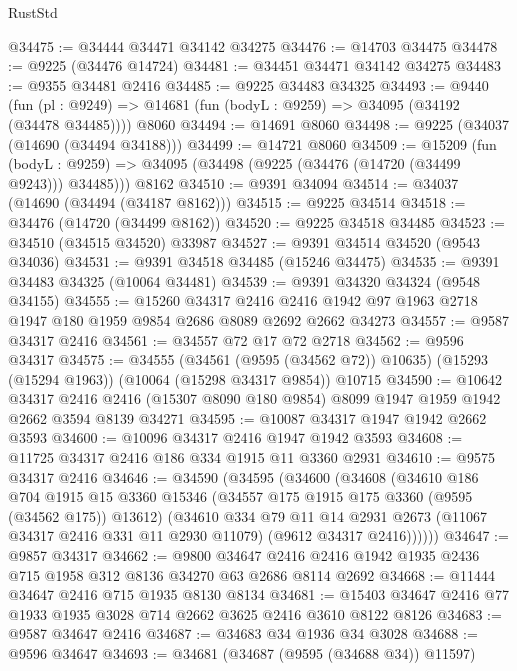 \begin{lexlean}{RustStd}
\begin{coremodule}
@34475 := @34444 @34471 @34142 @34275
@34476 := @14703 @34475
@34478 := @9225 (@34476 @14724)
@34481 := @34451 @34471 @34142 @34275
@34483 := @9355 @34481 @2416
@34485 := @9225 @34483 @34325
@34493 := @9440
    (fun (pl : @9249) => @14681 (fun (bodyL : @9259) => @34095 (@34192 (@34478 @34485))))
    @8060
@34494 := @14691 @8060
@34498 := @9225 (@34037 (@14690 (@34494 @34188)))
@34499 := @14721 @8060
@34509 := @15209
    (fun (bodyL : @9259) => @34095 (@34498 (@9225 (@34476 (@14720 (@34499 @9243))) @34485)))
    @8162
@34510 := @9391 @34094
@34514 := @34037 (@14690 (@34494 (@34187 @8162)))
@34515 := @9225 @34514
@34518 := @34476 (@14720 (@34499 @8162))
@34520 := @9225 @34518 @34485
@34523 := @34510 (@34515 @34520) @33987
@34527 := @9391 @34514 @34520 (@9543 @34036)
@34531 := @9391 @34518 @34485 (@15246 @34475)
@34535 := @9391 @34483 @34325 (@10064 @34481)
@34539 := @9391 @34320 @34324 (@9548 @34155)
@34555 := @15260
    @34317
    @2416
    @2416
    @1942
    @97
    @1963
    @2718
    @1947
    @180
    @1959
    @9854
    @2686
    @8089
    @2692
    @2662
    @34273
@34557 := @9587 @34317 @2416
@34561 := @34557 @72 @17 @72 @2718
@34562 := @9596 @34317
@34575 := @34555
    (@34561 (@9595 (@34562 @72)) @10635)
    (@15293 (@15294 @1963))
    (@10064 (@15298 @34317 @9854))
    @10715
@34590 := @10642
    @34317
    @2416
    @2416
    (@15307 @8090 @180 @9854)
    @8099
    @1947
    @1959
    @1942
    @2662
    @3594
    @8139
    @34271
@34595 := @10087 @34317 @1947 @1942 @2662 @3593
@34600 := @10096 @34317 @2416 @1947 @1942 @3593
@34608 := @11725 @34317 @2416 @186 @334 @1915 @11 @3360 @2931
@34610 := @9575 @34317 @2416
@34646 := @34590
    (@34595
      (@34600
        (@34608
          (@34610
            @186
            @704
            @1915
            @15
            @3360
            @15346
            (@34557 @175 @1915 @175 @3360 (@9595 (@34562 @175)) @13612)
            (@34610
              @334
              @79
              @11
              @14
              @2931
              @2673
              (@11067 @34317 @2416 @331 @11 @2930 @11079)
              (@9612 @34317 @2416))))))
@34647 := @9857 @34317
@34662 := @9800
    @34647
    @2416
    @2416
    @1942
    @1935
    @2436
    @715
    @1958
    @312
    @8136
    @34270
    @63
    @2686
    @8114
    @2692
@34668 := @11444 @34647 @2416 @715 @1935 @8130 @8134
@34681 := @15403 @34647 @2416 @77 @1933 @1935 @3028 @714 @2662 @3625 @2416 @3610 @8122 @8126
@34683 := @9587 @34647 @2416
@34687 := @34683 @34 @1936 @34 @3028
@34688 := @9596 @34647
@34693 := @34681 (@34687 (@9595 (@34688 @34)) @11597)

\end{coremodule}
\end{lexlean}

